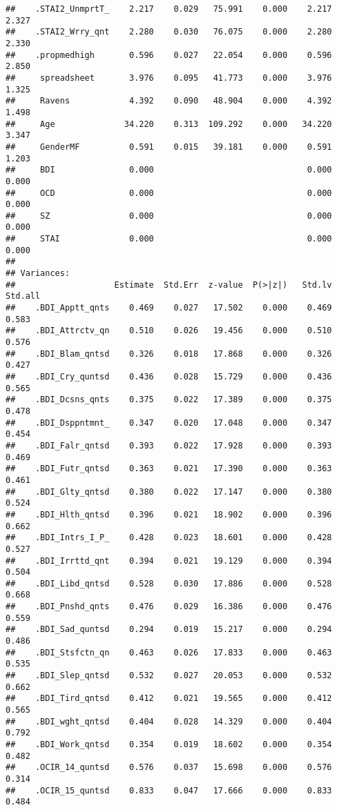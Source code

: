 \documentclass[]{article}
\begin{document}
\begin{verbatim}
##    .STAI2_UnmprtT_    2.217    0.029   75.991    0.000    2.217    2.327
##    .STAI2_Wrry_qnt    2.280    0.030   76.075    0.000    2.280    2.330
##    .propmedhigh       0.596    0.027   22.054    0.000    0.596    2.850
##     spreadsheet       3.976    0.095   41.773    0.000    3.976    1.325
##     Ravens            4.392    0.090   48.904    0.000    4.392    1.498
##     Age              34.220    0.313  109.292    0.000   34.220    3.347
##     GenderMF          0.591    0.015   39.181    0.000    0.591    1.203
##     BDI               0.000                               0.000    0.000
##     OCD               0.000                               0.000    0.000
##     SZ                0.000                               0.000    0.000
##     STAI              0.000                               0.000    0.000
## 
## Variances:
##                    Estimate  Std.Err  z-value  P(>|z|)   Std.lv  Std.all
##    .BDI_Apptt_qnts    0.469    0.027   17.502    0.000    0.469    0.583
##    .BDI_Attrctv_qn    0.510    0.026   19.456    0.000    0.510    0.576
##    .BDI_Blam_qntsd    0.326    0.018   17.868    0.000    0.326    0.427
##    .BDI_Cry_quntsd    0.436    0.028   15.729    0.000    0.436    0.565
##    .BDI_Dcsns_qnts    0.375    0.022   17.389    0.000    0.375    0.478
##    .BDI_Dsppntmnt_    0.347    0.020   17.048    0.000    0.347    0.454
##    .BDI_Falr_qntsd    0.393    0.022   17.928    0.000    0.393    0.469
##    .BDI_Futr_qntsd    0.363    0.021   17.390    0.000    0.363    0.461
##    .BDI_Glty_qntsd    0.380    0.022   17.147    0.000    0.380    0.524
##    .BDI_Hlth_qntsd    0.396    0.021   18.902    0.000    0.396    0.662
##    .BDI_Intrs_I_P_    0.428    0.023   18.601    0.000    0.428    0.527
##    .BDI_Irrttd_qnt    0.394    0.021   19.129    0.000    0.394    0.504
##    .BDI_Libd_qntsd    0.528    0.030   17.886    0.000    0.528    0.668
##    .BDI_Pnshd_qnts    0.476    0.029   16.386    0.000    0.476    0.559
##    .BDI_Sad_quntsd    0.294    0.019   15.217    0.000    0.294    0.486
##    .BDI_Stsfctn_qn    0.463    0.026   17.833    0.000    0.463    0.535
##    .BDI_Slep_qntsd    0.532    0.027   20.053    0.000    0.532    0.662
##    .BDI_Tird_qntsd    0.412    0.021   19.565    0.000    0.412    0.565
##    .BDI_wght_qntsd    0.404    0.028   14.329    0.000    0.404    0.792
##    .BDI_Work_qntsd    0.354    0.019   18.602    0.000    0.354    0.482
##    .OCIR_14_quntsd    0.576    0.037   15.698    0.000    0.576    0.314
##    .OCIR_15_quntsd    0.833    0.047   17.666    0.000    0.833    0.484

\end{verbatim}
\end{document}

